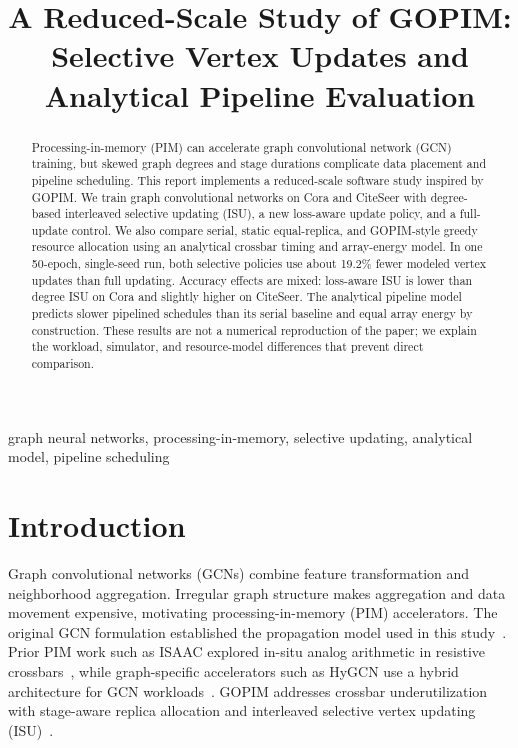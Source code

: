 \documentclass[conference]{IEEEtran}
\title{A Reduced-Scale Study of GOPIM: Selective Vertex Updates and Analytical Pipeline Evaluation}
\author{
\IEEEauthorblockN{Deepit Gupta, Lakshay Bansal, Pratyush, and Sanjeev}
}
\begin{document}
\maketitle

\begin{abstract}
Processing-in-memory (PIM) can accelerate graph convolutional network (GCN)
training, but skewed graph degrees and stage durations complicate data
placement and pipeline scheduling. This report implements a reduced-scale
software study inspired by GOPIM. We train graph convolutional networks on
Cora and CiteSeer with degree-based interleaved selective updating (ISU), a
new loss-aware update policy, and a full-update control. We also compare
serial, static equal-replica, and GOPIM-style greedy resource allocation using
an analytical crossbar timing and array-energy model. In one 50-epoch,
single-seed run, both selective policies use about 19.2\% fewer modeled
vertex updates than full updating. Accuracy effects are mixed: loss-aware ISU
is lower than degree ISU on Cora and slightly higher on CiteSeer. The
analytical pipeline model predicts slower pipelined schedules than its serial
baseline and equal array energy by construction. These results are not a
numerical reproduction of the paper; we explain the workload, simulator, and
resource-model differences that prevent direct comparison.
\end{abstract}

\begin{IEEEkeywords}
graph neural networks, processing-in-memory, selective updating, analytical
model, pipeline scheduling
\end{IEEEkeywords}

\section{Introduction}
Graph convolutional networks (GCNs) combine feature transformation and
neighborhood aggregation. Irregular graph structure makes aggregation and
data movement expensive, motivating processing-in-memory (PIM) accelerators.
The original GCN formulation established the propagation model used in this
study~\cite{kipf2017gcn}. Prior PIM work such as ISAAC explored in-situ analog
arithmetic in resistive crossbars~\cite{shafiee2016isaac}, while graph-specific
accelerators such as HyGCN use a hybrid architecture for GCN workloads~\cite{yan2020hygcn}.
GOPIM addresses crossbar underutilization with stage-aware replica allocation
and interleaved selective vertex updating (ISU)~\cite{yang2025gopim}.
\end{document}
